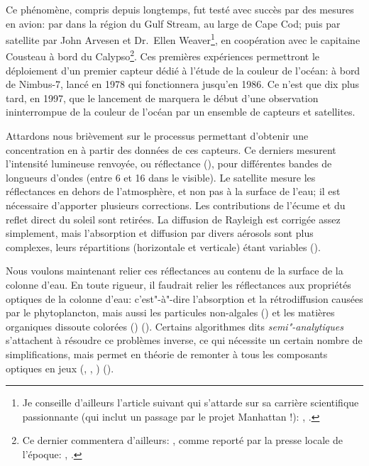 Ce phénomène, compris depuis longtemps, fut testé avec succès par des mesures en avion:  par \textcite{clarke_1970} dans la région du Gulf Stream, au large de Cape Cod; puis par satellite par John Arvesen et Dr.\ Ellen Weaver\footnote{%
  Je conseille d'ailleurs l'article suivant qui s'attarde sur sa carrière scientifique passionnante (qui inclut un passage par le projet Manhattan !): , \cite{marshall_2010}.},
en coopération avec le capitaine Cousteau à bord du Calypso\footnote{%
  Ce dernier commentera d'ailleurs: , comme reporté par la presse locale de l'époque:
  \href{ https://news.google.com/newspapers?nid=1454&dat=19730320&id=Nmo0AAAAIBAJ&sjid=8QkEAAAAIBAJ&pg=897,4493586&hl=en}{}, \cite{macomber_1973}.
}.
Ces premières expériences permettront le déploiement d'un premier capteur dédié à l'étude de la couleur de l'océan:  à bord de Nimbus-7, lancé en 1978 qui fonctionnera jusqu'en 1986.
Ce n'est que dix plus tard, en 1997, que le lancement de  marquera le début d'une observation ininterrompue de la couleur de l'océan par un ensemble de capteurs et satellites.

Attardons nous brièvement sur le processus permettant d'obtenir une concentration en  à partir des données de ces capteurs.
Ce derniers mesurent l'intensité lumineuse renvoyée, ou réflectance (), pour différentes bandes de longueurs d'ondes (entre 6 et 16 dans le visible).
Le satellite mesure les réflectances en dehors de l'atmosphère, et non pas à la surface de l'eau; il est nécessaire d'apporter plusieurs corrections.
Les contributions de l'écume et du reflet direct du soleil sont retirées.
La diffusion de Rayleigh est corrigée assez simplement, mais l'absorption et diffusion par divers aérosols sont plus complexes, leurs répartitions (horizontale et verticale) étant variables (\cite{werdell_2018}).

Nous voulons maintenant relier ces réflectances au contenu de la surface de la colonne d'eau.
En toute rigueur, il faudrait relier les réflectances aux propriétés optiques de la colonne d'eau: c'est"-à"-dire l’absorption et la rétrodiffusion causées par le phytoplancton, mais aussi les particules non-algales () et les matières organiques dissoute colorées () (\cite{werdell_2018}).
Certains algorithmes dits \emph{semi"-analytiques} s'attachent à résoudre ce problèmes inverse, ce qui nécessite un certain nombre de simplifications, mais permet en théorie de remonter à tous les composants optiques en jeux (, , ) (\cite{werdell_2019}).


